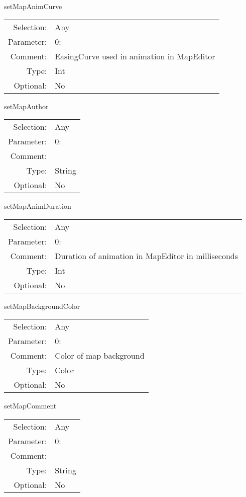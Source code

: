 \item setMapAnimCurve\\
\begin{tabular}{rl}
  Selection: & Any\\
   Parameter: &  0:\\
        Comment: & EasingCurve used in animation in MapEditor\\
           Type: & Int\\
       Optional: &  No\\
\end{tabular}

\item setMapAuthor\\
\begin{tabular}{rl}
  Selection: & Any\\
   Parameter: &  0:\\
        Comment: & \\
           Type: & String\\
       Optional: &  No\\
\end{tabular}

\item setMapAnimDuration\\
\begin{tabular}{rl}
  Selection: & Any\\
   Parameter: &  0:\\
        Comment: & Duration of animation in MapEditor in milliseconds\\
           Type: & Int\\
       Optional: &  No\\
\end{tabular}

\item setMapBackgroundColor\\
\begin{tabular}{rl}
  Selection: & Any\\
   Parameter: &  0:\\
        Comment: & Color of map background\\
           Type: & Color\\
       Optional: &  No\\
\end{tabular}

\item setMapComment\\
\begin{tabular}{rl}
  Selection: & Any\\
   Parameter: &  0:\\
        Comment: & \\
           Type: & String\\
       Optional: &  No\\
\end{tabular}

